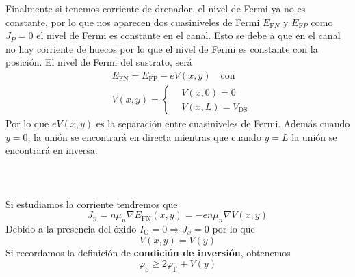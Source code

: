 Finalmente si tenemos corriente de drenador, el nivel de Fermi ya no es constante, por lo que nos aparecen dos cuasiniveles de Fermi $E_{\mathrm{F}N}$ y $E_{\mathrm{F}P}$ como $J_P=0$ el nivel de Fermi es constante en el canal. Esto se debe a que en el canal no hay corriente de huecos por lo que el nivel de Fermi es constante con la posición.
El nivel de Fermi del sustrato, será 
\begin{equation}
\begin{aligned}
    &E_\mathrm{FN}=E_\mathrm{FP}-eV(x,y) \quad \text{con}\\ &V(x,y)=\left \{ \begin{aligned}
        &V(x,0)=0\\
        &V(x,L)=V_\mathrm{DS}
    \end{aligned}\right.
    \end{aligned}
    \label{eq: Nivel de Fermi sustrato}
\end{equation}
Por lo que $eV(x,y)$ es la separación entre cuasiniveles de Fermi. Además cuando $y=0$, la unión se encontrará en directa mientras que cuando $y=L$ la unión se encontrará en inversa.\\\\\\\\
Si estudiamos la corriente tendremos que 
\begin{equation}
    J_n=n\mu_n \nabla E_\mathrm{FN}(x,y)=-en\mu_n \nabla V(x,y)
    \label{eq: Corriente de arrastre sustrato}
\end{equation}
Debido a la presencia del óxido $I_\mathrm{G}=0 \Rightarrow J_x=0$ por lo que $$V(x,y)=V(y)$$ Si recordamos la definición de \textbf{condición de inversión}, obtenemos \begin{equation}
\varphi_\mathrm{S}\geq 2\varphi_\mathrm{F}+V(y)
    \label{eq: Condición de inversion MOSFET}
\end{equation}
